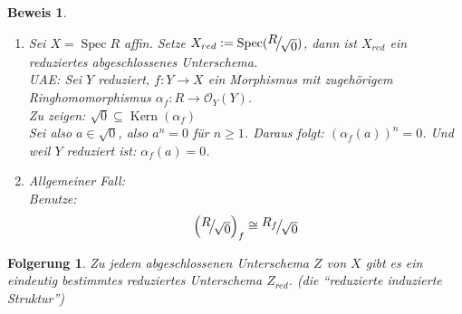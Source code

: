 \documentclass[a4paper,oneside]{scrbook}
\theoremstyle{break}
\newtheorem{Folg}[Def]{Folgerung}
\theoremstyle{nonumberbreak}
\theoremstyle{nonumberplain}
\newtheorem{Bew}{Beweis}
\theoremstyle{break}
\newcommand{\defeqr}[0]{\mathrel{\mathop:}=}
\newcommand{\Spec}{%
	\ensuremath{\operatorname{Spec}}%
}
\DeclareMathOperator{\Kern}{Kern}
\newcommand{\FakRaum}[2]{
  \raisebox{0.7ex}{\ensuremath{#1}}
  \ensuremath{\mkern-3mu}\big/\ensuremath{\mkern-3mu}
  \raisebox{-0.6ex}{\ensuremath{#2}}}
\begin{document}
\begin{Bew}
  \begin{enumerate}
  \item[(1)]   Sei $X=\Spec R$ affin. Setze $X_{red}\defeqr\Spec(\FakRaum{R}{\sqrt{0}})$, dann ist $X_{red}$ 
    ein reduziertes abgeschlossenes Unterschema. \\
    UAE: Sei $Y$ reduziert, $f:Y\to X$ ein Morphismus mit zugehörigem Ringhomomorphismus $\alpha_f:R\to\mathcal O_Y(Y)$. \\
    Zu zeigen: $\sqrt{0}\subseteq\Kern(\alpha_f)$ \\
    Sei also $a\in\sqrt{0}$, also $a^n=0$ für $n\geq 1$. Daraus folgt: $(\alpha_f(a))^n=0$. Und weil $Y$ reduziert ist: $\alpha_f(a)=0$.
  \item[(2)] Allgemeiner Fall: \\
    Benutze:
    \begin{align*}
      \left( \FakRaum{R}{\sqrt{0}}\right)_f\cong\FakRaum{R_f}{\sqrt{0}}
    \end{align*}
  \end{enumerate}
\end{Bew}

\begin{Folg}
  \label{folg:6.5}
  Zu jedem abgeschlossenen Unterschema $Z$ von $X$ gibt es ein eindeutig bestimmtes reduziertes Unterschema $Z_{red}$. 
  (die ``reduzierte induzierte Struktur'')
\end{Folg}
\end{document}
